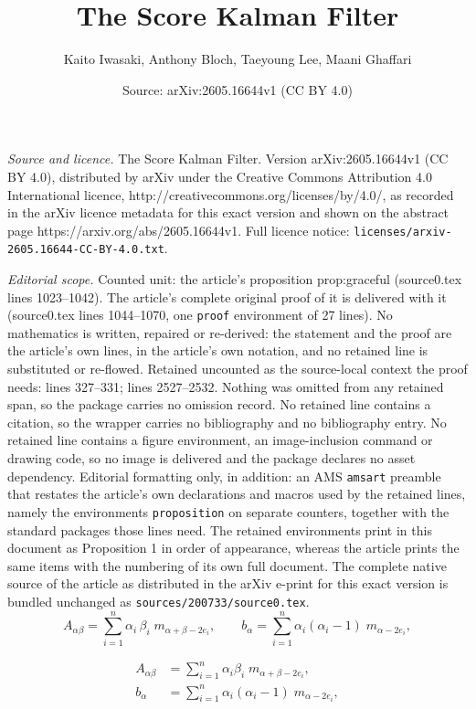 \documentclass[10pt,a4paper]{amsart}
\title{The Score Kalman Filter}
\author{Kaito Iwasaki, Anthony Bloch, Taeyoung Lee, Maani Ghaffari}
\date{Source: arXiv:2605.16644v1 (CC BY 4.0)}
\begin{document}
\maketitle

\noindent\emph{Source and licence.} The Score Kalman Filter. Version arXiv:2605.16644v1 (CC BY 4.0), distributed by arXiv under the Creative Commons Attribution 4.0 International licence, http://creativecommons.org/licenses/by/4.0/, as recorded in the arXiv licence metadata for this exact version and shown on the abstract page https://arxiv.org/abs/2605.16644v1. Full licence notice: \texttt{licenses/arxiv-2605.16644-CC-BY-4.0.txt}.\par\smallskip

\noindent\textit{Editorial scope.} Counted unit: the article's proposition prop:graceful (source0.tex lines 1023--1042). The article's complete original proof of it is delivered with it (source0.tex lines 1044--1070, one \texttt{proof} environment of 27 lines). No mathematics is written, repaired or re-derived: the statement and the proof are the article's own lines, in the article's own notation, and no retained line is substituted or re-flowed.  Retained uncounted as the source-local context the proof needs: lines 327--331; lines 2527--2532.  Nothing was omitted from any retained span, so the package carries no omission record.  No retained line contains a citation, so the wrapper carries no bibliography and no bibliography entry.  No retained line contains a figure environment, an image-inclusion command or drawing code, so no image is delivered and the package declares no asset dependency.  Editorial formatting only, in addition: an AMS \texttt{amsart} preamble that restates the article's own declarations and macros used by the retained lines, namely the environments \texttt{proposition} on separate counters, together with the standard packages those lines need.  The retained environments print in this document as Proposition 1 in order of appearance, whereas the article prints the same items with the numbering of its own full document.  The complete native source of the article as distributed in the arXiv e-print for this exact version is bundled unchanged as \texttt{sources/200733/source0.tex}.
\begin{equation}\label{eq:Ab}
    A_{\alpha\beta} = \sum_{i=1}^n \alpha_i\,\beta_i\; m_{\alpha+\beta-2e_i},
    \qquad
    b_\alpha = \sum_{i=1}^n \alpha_i(\alpha_i{-}1)\; m_{\alpha-2e_i},
\end{equation}

\begin{align}
    A_{\alpha\beta} &=
    \sum_{i=1}^n \alpha_i \beta_i\; m_{\alpha+\beta-2e_i}, \label{eq:A-entry}\\
    b_\alpha &= \sum_{i=1}^n \alpha_i (\alpha_i - 1)\; m_{\alpha-2e_i},
    \label{eq:b-entry}
\end{align}
\end{document}
